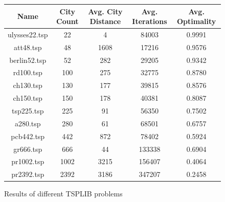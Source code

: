 \documentclass{article}
\begin{document}
\begin{figure}[h]
    \centering
    \begin{tabular}{ |c|c|c|c|c| } 
        \hline
        Name & City Count & Avg. City Distance & Avg. Iterations & Avg. Optimality \\ 
        \hline
        ulysses22.tsp & 22   & 4    & 84003  & 0.9991 \\
        \hline
        att48.tsp     & 48   & 1608 & 17216  & 0.9576 \\
        \hline
        berlin52.tsp  & 52   & 282  & 29205  & 0.9342 \\ 
        \hline
        rd100.tsp     & 100  & 275  & 32775  & 0.8780 \\
        \hline
        ch130.tsp     & 130  & 177  & 39815  & 0.8576 \\
        \hline
        ch150.tsp     & 150  & 178  & 40381  & 0.8087 \\
        \hline
        tsp225.tsp    & 225  & 91   & 56350  & 0.7502 \\
        \hline
        a280.tsp      & 280  & 61   & 68501  & 0.6757 \\
        \hline
        pcb442.tsp    & 442  & 872  & 78402  & 0.5924 \\
        \hline
        gr666.tsp     & 666  & 44   & 133338 & 0.6904 \\
        \hline
        pr1002.tsp    & 1002 & 3215 & 156407 & 0.4064 \\
        \hline
        pr2392.tsp    & 2392 & 3186 & 347207 & 0.2458 \\
        \hline
    \end{tabular}
    \caption{Results of different TSPLIB problems}
\end{figure}
\end{document}
